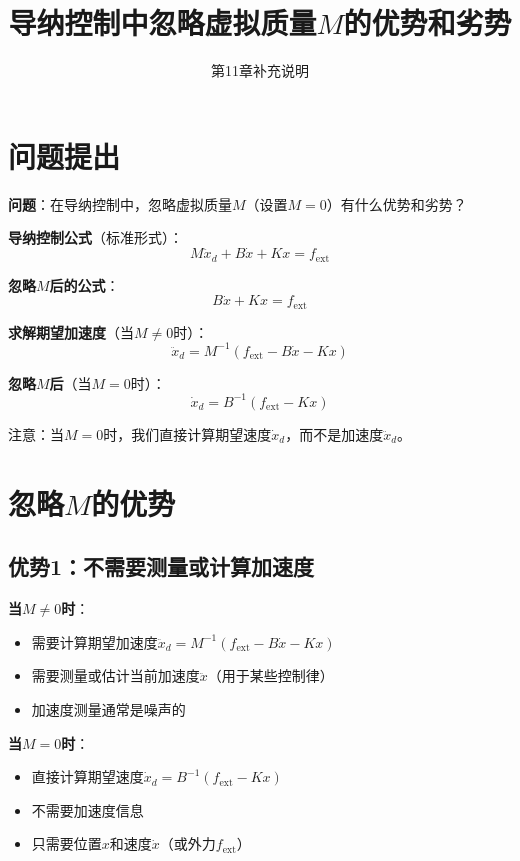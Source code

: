 \documentclass[12pt,a4paper]{article}
\title{导纳控制中忽略虚拟质量$M$的优势和劣势}
\author{第11章补充说明}
\date{}
\begin{document}
\maketitle

\section{问题提出}

\textbf{问题}：在导纳控制中，忽略虚拟质量$M$（设置$M = 0$）有什么优势和劣势？

\textbf{导纳控制公式}（标准形式）：
\begin{equation}
M\ddot{x}_d + B\dot{x} + Kx = f_{\text{ext}} \tag{11.64}
\end{equation}

\textbf{忽略$M$后的公式}：
\begin{equation}
B\dot{x} + Kx = f_{\text{ext}} \tag{11.64-M=0}
\end{equation}

\textbf{求解期望加速度}（当$M \neq 0$时）：
\begin{equation}
\ddot{x}_d = M^{-1}(f_{\text{ext}} - B\dot{x} - Kx) \tag{11.66}
\end{equation}

\textbf{忽略$M$后}（当$M = 0$时）：
\begin{equation}
\dot{x}_d = B^{-1}(f_{\text{ext}} - Kx) \tag{11.66-M=0}
\end{equation}

注意：当$M = 0$时，我们直接计算期望速度$\dot{x}_d$，而不是加速度$\ddot{x}_d$。

\section{忽略$M$的优势}

\subsection{优势1：不需要测量或计算加速度}

\textbf{当$M \neq 0$时}：
\begin{itemize}
\item 需要计算期望加速度$\ddot{x}_d = M^{-1}(f_{\text{ext}} - B\dot{x} - Kx)$
\item 需要测量或估计当前加速度$\ddot{x}$（用于某些控制律）
\item 加速度测量通常是噪声的
\end{itemize}

\textbf{当$M = 0$时}：
\begin{itemize}
\item 直接计算期望速度$\dot{x}_d = B^{-1}(f_{\text{ext}} - Kx)$
\item 不需要加速度信息
\item 只需要位置$x$和速度$\dot{x}$（或外力$f_{\text{ext}}$）
\end{itemize}
\end{document}
